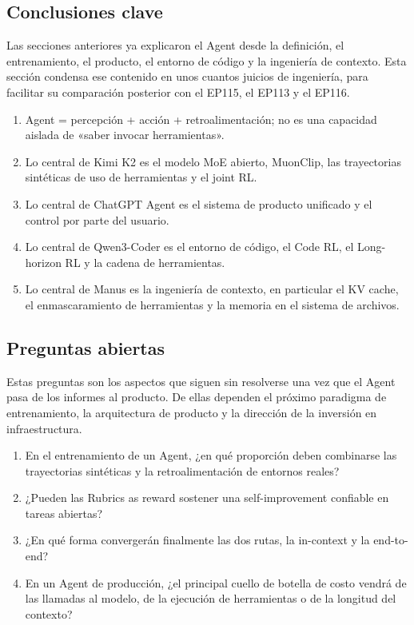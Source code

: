 \subsection{Conclusiones clave}

Las secciones anteriores ya explicaron el Agent desde la definición, el entrenamiento, el producto, el entorno de código y la ingeniería de contexto. Esta sección condensa ese contenido en unos cuantos juicios de ingeniería, para facilitar su comparación posterior con el EP115, el EP113 y el EP116.

\begin{enumerate}
\item Agent = percepción + acción + retroalimentación; no es una capacidad aislada de «saber invocar herramientas».
\item Lo central de Kimi K2 es el modelo MoE abierto, MuonClip, las trayectorias sintéticas de uso de herramientas y el joint RL.
\item Lo central de ChatGPT Agent es el sistema de producto unificado y el control por parte del usuario.
\item Lo central de Qwen3-Coder es el entorno de código, el Code RL, el Long-horizon RL y la cadena de herramientas.
\item Lo central de Manus es la ingeniería de contexto, en particular el KV cache, el enmascaramiento de herramientas y la memoria en el sistema de archivos.
\end{enumerate}

\subsection{Preguntas abiertas}

Estas preguntas son los aspectos que siguen sin resolverse una vez que el Agent pasa de los informes al producto. De ellas dependen el próximo paradigma de entrenamiento, la arquitectura de producto y la dirección de la inversión en infraestructura.

\begin{enumerate}
\item En el entrenamiento de un Agent, ¿en qué proporción deben combinarse las trayectorias sintéticas y la retroalimentación de entornos reales?
\item ¿Pueden las Rubrics as reward sostener una self-improvement confiable en tareas abiertas?
\item ¿En qué forma convergerán finalmente las dos rutas, la in-context y la end-to-end?
\item En un Agent de producción, ¿el principal cuello de botella de costo vendrá de las llamadas al modelo, de la ejecución de herramientas o de la longitud del contexto?
\end{enumerate}

